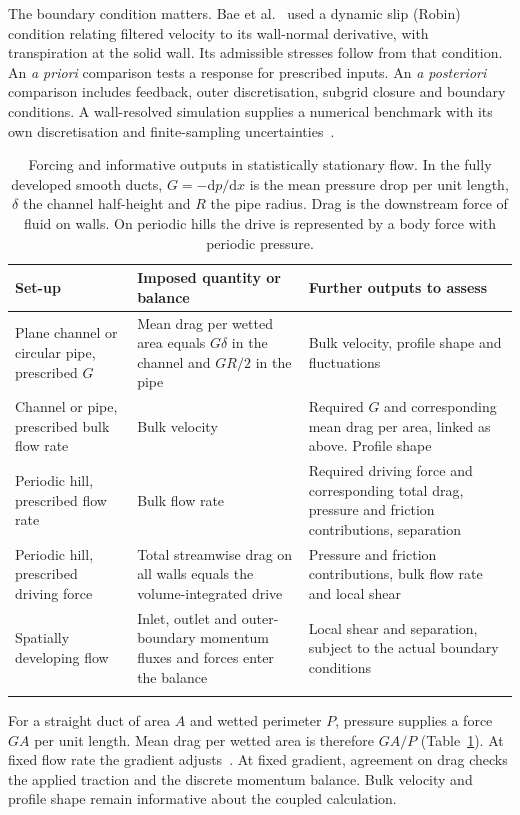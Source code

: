 \documentclass[pdflatex,sn-nature,iicol]{sn-jnl}
\begin{document}
The boundary condition matters. Bae et al.~\cite{Bae2018} used a dynamic slip (Robin) condition relating filtered velocity to its wall-normal derivative, with transpiration at the solid wall. Its admissible stresses follow from that condition. An \emph{a priori} comparison tests a response for prescribed inputs. An \emph{a posteriori} comparison includes feedback, outer discretisation, subgrid closure and boundary conditions. A wall-resolved simulation supplies a numerical benchmark with its own discretisation and finite-sampling uncertainties~\cite{OberkampfTrucano2002,Oliver2014}.

\begin{table}[t]
\caption{Forcing and informative outputs in statistically stationary flow. In the fully developed smooth ducts, $G=-\mathrm{d}p/\mathrm{d}x$ is the mean pressure drop per unit length, $\delta$ the channel half-height and $R$ the pipe radius. Drag is the downstream force of fluid on walls. On periodic hills the drive is represented by a body force with periodic pressure.}\label{tab:tests}
\footnotesize
\begin{tabular*}{\textwidth}{@{\extracolsep{\fill}}p{}p{}p{}@{}}
\toprule
Set-up & Imposed quantity or balance & Further outputs to assess \\
\midrule
Plane channel or circular pipe, prescribed $G$ & Mean drag per wetted area equals $G\delta$ in the channel and $GR/2$ in the pipe & Bulk velocity, profile shape and fluctuations \\
Channel or pipe, prescribed bulk flow rate & Bulk velocity & Required $G$ and corresponding mean drag per area, linked as above. Profile shape \\
Periodic hill, prescribed flow rate & Bulk flow rate & Required driving force and corresponding total drag, pressure and friction contributions, separation \\
Periodic hill, prescribed driving force & Total streamwise drag on all walls equals the volume-integrated drive & Pressure and friction contributions, bulk flow rate and local shear \\
Spatially developing flow & Inlet, outlet and outer-boundary momentum fluxes and forces enter the balance & Local shear and separation, subject to the actual boundary conditions \\
\botrule
\end{tabular*}
\end{table}

For a straight duct of area $A$ and wetted perimeter $P$, pressure supplies a force $GA$ per unit length. Mean drag per wetted area is therefore $GA/P$ (Table~\ref{tab:tests}). At fixed flow rate the gradient adjusts~\cite{Quadrio2016}. At fixed gradient, agreement on drag checks the applied traction and the discrete momentum balance. Bulk velocity and profile shape remain informative about the coupled calculation.
\end{document}
